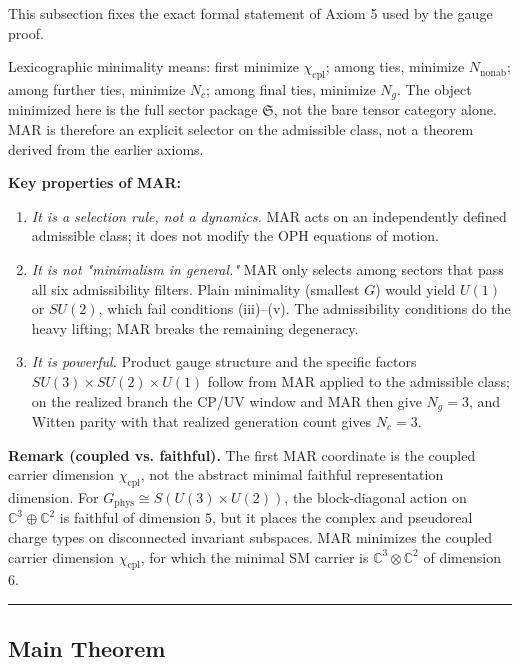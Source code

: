 This subsection fixes the exact formal statement of Axiom 5 used by the gauge proof.

Lexicographic minimality means: first minimize \(\chi_{\mathrm{cpl}}\); among ties, minimize \(N_{\mathrm{nonab}}\); among further ties, minimize \(N_c\); among final ties, minimize \(N_g\). The object minimized here is the full sector package \(\mathfrak S\), not the bare tensor category alone. MAR is therefore an explicit selector on the admissible class, not a theorem derived from the earlier axioms.

\textbf{Key properties of MAR:}

\begin{enumerate}
\def\labelenumi{\arabic{enumi}.}
\item
  \emph{It is a selection rule, not a dynamics.} MAR acts on an independently defined admissible class; it does not modify the OPH equations of motion.
\item
  \emph{It is not "minimalism in general."} MAR only selects among sectors that pass all six admissibility filters. Plain minimality (smallest \(G\)) would yield \(U(1)\) or \(SU(2)\), which fail conditions (iii)--(v). The admissibility conditions do the heavy lifting; MAR breaks the remaining degeneracy.
\item
  \emph{It is powerful.} Product gauge structure and the specific factors \(SU(3) \times SU(2) \times U(1)\) follow from MAR applied to the admissible class; on the realized branch the CP/UV window and MAR then give \(N_g = 3\), and Witten parity with that realized generation count gives \(N_c = 3\).
\end{enumerate}

\textbf{Remark (coupled vs. faithful).} The first MAR coordinate is the coupled carrier dimension \(\chi_{\mathrm{cpl}}\), not the abstract minimal faithful representation dimension. For \(G_{\mathrm{phys}} \cong S(U(3) \times U(2))\), the block-diagonal action on \(\mathbb{C}^3 \oplus \mathbb{C}^2\) is faithful of dimension \(5\), but it places the complex and pseudoreal charge types on disconnected invariant subspaces. MAR minimizes the coupled carrier dimension \(\chi_{\mathrm{cpl}}\), for which the minimal SM carrier is \(\mathbb{C}^3 \otimes \mathbb{C}^2\) of dimension \(6\).

\begin{center}\rule{0.5\linewidth}{0.5pt}\end{center}

\subsection{Main Theorem}\label{4-main-theorem}

